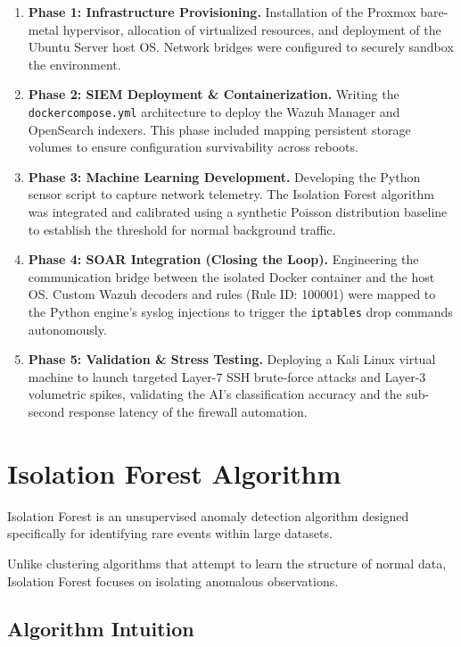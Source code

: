 \documentclass[12pt, a4paper]{report}
\begin{document}
	\begin{enumerate}
		\item \textbf{Phase 1: Infrastructure Provisioning.} Installation of the Proxmox bare-metal hypervisor, allocation of virtualized resources, and deployment of the Ubuntu Server host OS. Network bridges were configured to securely sandbox the environment.
		\item \textbf{Phase 2: SIEM Deployment \& Containerization.} Writing the \texttt{docker\-compose.yml} architecture to deploy the Wazuh Manager and OpenSearch indexers. This phase included mapping persistent storage volumes to ensure configuration survivability across reboots.
		\item \textbf{Phase 3: Machine Learning Development.} Developing the Python sensor script to capture network telemetry. The Isolation Forest algorithm was integrated and calibrated using a synthetic Poisson distribution baseline to establish the threshold for normal background traffic.
		\item \textbf{Phase 4: SOAR Integration (Closing the Loop).} Engineering the communication bridge between the isolated Docker container and the host OS. Custom Wazuh decoders and rules (Rule ID: 100001) were mapped to the Python engine's syslog injections to trigger the \texttt{iptables} drop commands autonomously.
		\item \textbf{Phase 5: Validation \& Stress Testing.} Deploying a Kali Linux virtual machine to launch targeted Layer-7 SSH brute-force attacks and Layer-3 volumetric spikes, validating the AI's classification accuracy and the sub-second response latency of the firewall automation.
	\end{enumerate}
	
	\section{Isolation Forest Algorithm}
	
	Isolation Forest is an unsupervised anomaly detection algorithm designed specifically for identifying rare events within large datasets.
	
	Unlike clustering algorithms that attempt to learn the structure of normal data, Isolation Forest focuses on isolating anomalous observations.
	
	\subsection{Algorithm Intuition}
	
\end{document}
